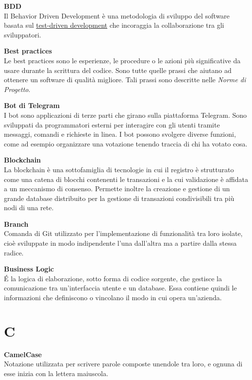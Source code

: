 \documentclass[a4paper, oneside, openany, dvipsnames, table, 12pt]{article}
\begin{document}
\textbf{BDD} \\
Il Behavior Driven Development è una metodologia di sviluppo del software basata sul \hyperref[par:tdd]{test-driven development} che incoraggia la collaborazione tra gli sviluppatori.

\textbf{Best practices} \\
Le best practices sono le esperienze, le procedure o le azioni più significative da usare durante la scrittura del codice. Sono tutte quelle prassi che aiutano ad ottenere un software di qualità migliore. Tali prassi sono descritte nelle \textit{Norme di Progetto}.

\textbf{Bot di Telegram} \\
I bot sono applicazioni di terze parti che girano sulla piattaforma Telegram. Sono sviluppati da programmatori esterni per interagire con gli utenti tramite messaggi, comandi e richieste in linea. I bot possono svolgere diverse funzioni, come ad esempio organizzare una votazione tenendo traccia di chi ha votato cosa.

\label{par:blockC}
\textbf{Blockchain} \\
La blockchain è una sottofamiglia di tecnologie in cui il registro è strutturato come una catena di blocchi contenenti le transazioni e la cui validazione è affidata a un meccanismo di consenso. 
Permette inoltre la creazione e gestione di un grande database distribuito per la gestione di transazioni condivisibili tra più nodi di una rete. 

\textbf{Branch} \\
Comanda di Git utilizzato per l’implementazione di funzionalità tra loro isolate, cioè sviluppate in modo indipendente l’una dall’altra ma a partire dalla stessa radice.

\textbf{Business Logic} \\
\'E la logica di elaborazione, sotto forma di codice sorgente, che gestisce la comunicazione tra un'interfaccia utente e un database.
Essa contiene quindi le informazioni che definiscono o vincolano il modo in cui opera un'azienda.



\newpage
\section{C}
\textbf{CamelCase} \\
Notazione utilizzata per scrivere parole composte unendole tra loro, e ognuna di esse inizia con la lettera maiuscola.
\end{document}
